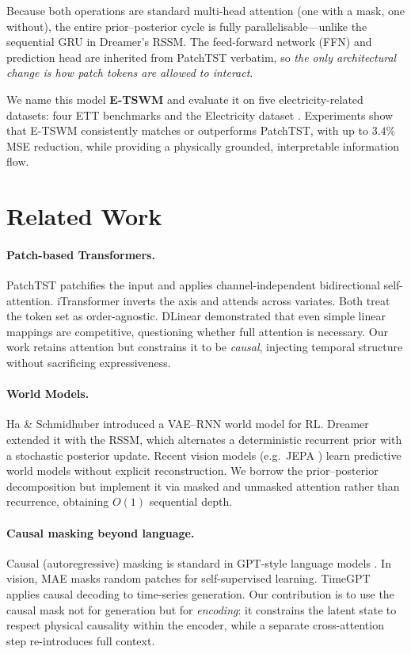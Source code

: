 \documentclass[conference]{IEEEtran}
\begin{document}
Because both operations are standard multi-head attention (one with a mask, one without), the entire prior--posterior cycle is fully parallelisable---unlike the sequential GRU in Dreamer's RSSM. The feed-forward network (FFN) and prediction head are inherited from PatchTST verbatim, so \emph{the only architectural change is how patch tokens are allowed to interact}.

We name this model \textbf{E-TSWM} and evaluate it on five electricity-related datasets: four ETT benchmarks \cite{b_informer} and the Electricity dataset \cite{b_electricity}. Experiments show that E-TSWM consistently matches or outperforms PatchTST, with up to $3.4\%$ MSE reduction, while providing a physically grounded, interpretable information flow.

\section{Related Work}

\paragraph{Patch-based Transformers.}
PatchTST \cite{b_patchtst} patchifies the input and applies channel-independent bidirectional self-attention. iTransformer \cite{b_itransformer} inverts the axis and attends across variates. Both treat the token set as order-agnostic. DLinear \cite{b_dlinear} demonstrated that even simple linear mappings are competitive, questioning whether full attention is necessary. Our work retains attention but constrains it to be \emph{causal}, injecting temporal structure without sacrificing expressiveness.

\paragraph{World Models.}
Ha \& Schmidhuber \cite{b_worldmodel} introduced a VAE--RNN world model for RL. Dreamer \cite{b_dreamer} extended it with the RSSM, which alternates a deterministic recurrent prior with a stochastic posterior update. Recent vision models (e.g.\ JEPA \cite{b_jepa}) learn predictive world models without explicit reconstruction. We borrow the prior--posterior decomposition but implement it via masked and unmasked attention rather than recurrence, obtaining $O(1)$ sequential depth.

\paragraph{Causal masking beyond language.}
Causal (autoregressive) masking is standard in GPT-style language models \cite{b_gpt}. In vision, MAE \cite{b_mae} masks random patches for self-supervised learning. TimeGPT \cite{b_timegpt} applies causal decoding to time-series generation. Our contribution is to use the causal mask not for generation but for \emph{encoding}: it constrains the latent state to respect physical causality within the encoder, while a separate cross-attention step re-introduces full context.
\end{document}
